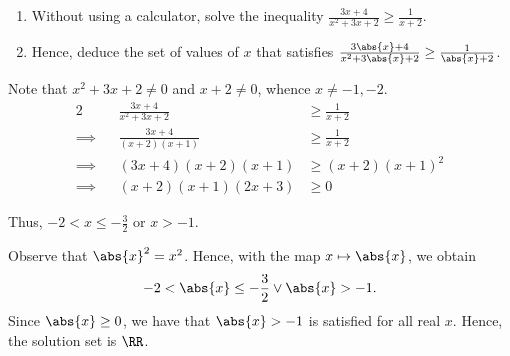 \begin{problem}
    \begin{enumerate}
        \item Without using a calculator, solve the inequality $\frac{3x+4}{x^2+3x+2} \geq \frac{1}{x+2}$.
        \item Hence, deduce the set of values of $x$ that satisfies $\frac{3\abs{x}+4}{x^2+3\abs{x}+2} \geq \frac{1}{\abs{x}+2}$.
    \end{enumerate}
\end{problem}
\begin{solution}
    \begin{ppart}
        Note that $x^2 + 3x + 2 \neq 0$ and $x + 2 \neq 0$, whence $x \neq -1, -2$.
        \begin{alignat*}{2}
            &&\frac{3x+4}{x^2+3x+2} &\geq \frac{1}{x+2}\\
            \implies&& \frac{3x+4}{(x+2)(x+1)} &\geq \frac{1}{x+2}\\
            \implies&& (3x+4)(x+2)(x+1) &\geq (x+2)(x+1)^2 \\
            \implies&& (x+2)(x+1)(2x+3) &\geq 0
        \end{alignat*}
        \begin{center}
        \end{center}
        Thus, $-2 < x \leq -\frac32$ or $x > -1$.
    \end{ppart}
    \begin{ppart}
        Observe that $\abs{x}^2 = x^2$. Hence, with the map $x \mapsto \abs{x}$, we obtain \[-2 < \abs{x} \leq -\frac32 \lor \abs{x} > -1.\] Since $\abs{x} \geq 0$, we have that $\abs{x} > -1$ is satisfied for all real $x$. Hence, the solution set is $\RR$.
    \end{ppart}
\end{solution}    

